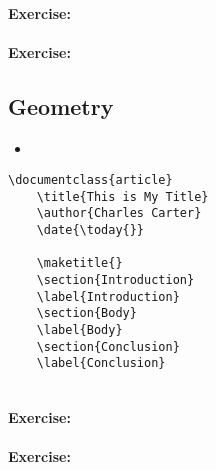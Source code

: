         \paragraph{Exercise:}

        \paragraph{Exercise:}


        \subsection{Geometry}
        \label{Geometry}
        
        \begin{framed}
            \begin{itemize}
                \item{}
            \end{itemize}
        \end{framed}


        \begin{verbatim}
\documentclass{article}
    \title{This is My Title}
    \author{Charles Carter}
    \date{\today{}}
 
    \maketitle{}
    \section{Introduction}
    \label{Introduction}
    \section{Body}
    \label{Body}
    \section{Conclusion}
    \label{Conclusion}
    
        \end{verbatim}

        \paragraph{Exercise:}

        \paragraph{Exercise:}

